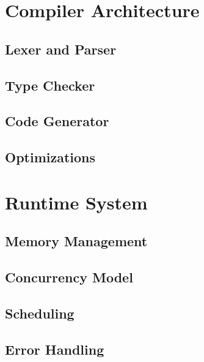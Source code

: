 
\section{Compiler Architecture}

\subsection{Lexer and Parser}

\subsection{Type Checker}

\subsection{Code Generator}

\subsection{Optimizations}

\section{Runtime System}

\subsection{Memory Management}

\subsection{Concurrency Model}

\subsection{Scheduling}

\subsection{Error Handling}


